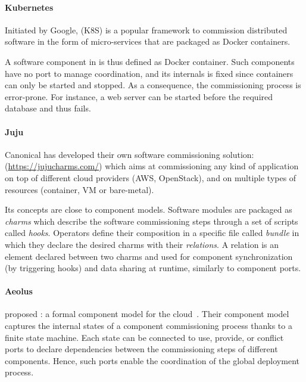\paragraph{Kubernetes}
Initiated by Google, \kubernetes (K8S) is a popular
framework to commission distributed software in the form of micro-services that
are packaged as Docker containers.

A software component in \kubernetes is thus defined as Docker container. Such
components have no port to manage coordination, and its internals is fixed since
containers can only be started and stopped. As a consequence, the commissioning
process is error-prone. For instance, a web server can be started before the
required database and thus fails.

\paragraph{Juju}
Canonical has developed their own software commissioning solution: \juju
(\url{https://jujucharms.com/}) which aims at commissioning any kind of
application on top of different cloud providers (\eg AWS, OpenStack), and on
multiple types of resources (container, VM or bare-metal).

Its concepts are close to component models. Software modules are packaged as
\juju \emph{charms} which describe the software commissioning steps through a
set of scripts called \emph{hooks}. Operators define their composition in a
specific file called \emph{bundle} in which they declare the desired charms with
their \emph{relations}. A relation is an element declared between two charms and
used for component synchronization (by triggering hooks) and data sharing at
runtime, similarly to component ports.

\paragraph{Aeolus}
\citeauthor{dicosmo2014ic} proposed \aeolus: a formal component model for the
cloud~\cite{dicosmo2014ic}. Their component model captures the internal states
of a component commissioning process thanks to a finite state machine. Each
state can be connected to use, provide, or conflict ports to declare
dependencies between the commissioning steps of different components. Hence,
such ports enable the coordination of the global deployment process.



